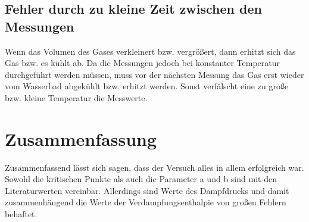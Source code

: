 \documentclass[11pt, a4paper]{article}
\begin{document}
    \subsection{Fehler durch zu kleine Zeit zwischen den Messungen}

    Wenn das Volumen des Gases verkleinert bzw. vergrößert, dann erhitzt sich das Gas bzw. es kühlt ab.
    Da die Messungen jedoch bei konstanter Temperatur durchgeführt werden müssen, muss vor 
    der nächsten Messung das Gas erst wieder vom Wasserbad abgekühlt bzw. erhitzt werden. Sonst verfälscht
    eine zu große bzw. kleine Temperatur die Messwerte.
    \section{Zusammenfassung}
	Zusammenfassend lässt sich sagen, dass der Versuch alles in allem erfolgreich war. Sowohl die kritischen Punkte als auch die Parameter a und b sind mit den 
	Literaturwerten vereinbar. Allerdings sind Werte des Dampfdrucks und damit zusammenhängend die Werte der Verdampfungsenthalpie von großen Fehlern behaftet. 

    
    
\end{document}
